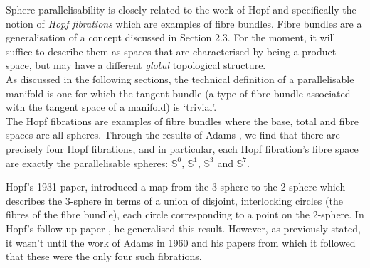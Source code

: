 \documentclass[12pt,a4paper]{article}
\begin{document}
Sphere parallelisability is closely related to the work of Hopf and specifically the notion of \textit{Hopf fibrations} which are examples of fibre bundles. Fibre bundles are a generalisation of a concept discussed in Section 2.3. For the moment, it will suffice to describe them as spaces that are characterised by being  a product space, but may have a different \textit{global} topological structure. \\


As discussed in the following sections, the technical definition of a parallelisable manifold is one for which the tangent bundle (a type of fibre bundle associated with the tangent space of a manifold) is `trivial'.\\

The Hopf fibrations are examples of fibre bundles where the base, total and fibre spaces are all spheres. Through the results of Adams \cite{MR0141119}, we find that there are precisely four Hopf fibrations, and in particular, each Hopf fibration's fibre space are exactly the parallelisable spheres: $\mathbb{S}^0$, $\mathbb{S}^1$, $\mathbb{S}^3$ and $\mathbb{S}^7$.\\

\pagebreak

Hopf's 1931 paper, \cite{MR1512691} introduced a map from the 3-sphere to the 2-sphere which describes the 3-sphere in terms of a union of disjoint, interlocking circles (the fibres of the fibre bundle), each circle corresponding to a point on the 2-sphere. In Hopf's follow up paper \cite{Hopf1935}, he generalised this result. However, as previously stated, it wasn't until the work of Adams in 1960 and his papers \cite{MR0141119,MR0139178} from which it followed that these were the only four such fibrations.\\

\end{document}
